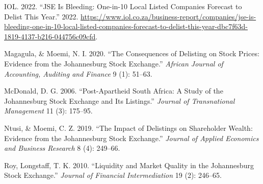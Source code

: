 \documentclass[
]{article}
\newlength{\cslhangindent}
\newlength{\cslentryspacingunit} %
\newenvironment{CSLReferences}[2] %
 {%
  \setlength{\parindent}{0pt}
  \ifodd #1
  \let\oldpar\par
  \def\par{\hangindent=\cslhangindent\oldpar}
  \fi
  \setlength{\parskip}{#2\cslentryspacingunit}
 }%
 {}
\begin{document}
\begin{CSLReferences}{1}{0}
\leavevmode{}%
IOL. 2022. {``JSE Is Bleeding: One-in-10 Local Listed Companies Forecast
to Delist This Year.''} 2022.
\url{https://www.iol.co.za/business-report/companies/jse-is-bleeding-one-in-10-local-listed-companies-forecast-to-delist-this-year-dbc7f63d-1819-4137-b216-044756c09cfd}.

\leavevmode{}%
Magagula, \& Moemi, N. I. 2020. {``The Consequences of Delisting on
Stock Prices: Evidence from the Johannesburg Stock Exchange.''}
\emph{African Journal of Accounting, Auditing and Finance} 9 (1):
51--63.

\leavevmode{}%
McDonald, D. G. 2006. {``Post-Apartheid South Africa: A Study of the
Johannesburg Stock Exchange and Its Listings.''} \emph{Journal of
Transnational Management} 11 (3): 175--95.

\leavevmode{}%
Ntusi, \& Moemi, C. Z. 2019. {``The Impact of Delistings on Shareholder
Wealth: Evidence from the Johannesburg Stock Exchange.''} \emph{Journal
of Applied Economics and Business Research} 8 (4): 249--66.

\leavevmode{}%
Roy, Longstaff, T. K. 2010. {``Liquidity and Market Quality in the
Johannesburg Stock Exchange.''} \emph{Journal of Financial
Intermediation} 19 (2): 246--65.

\end{CSLReferences}
\end{document}
